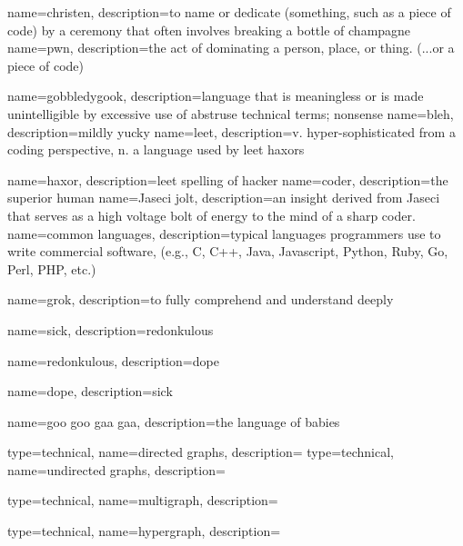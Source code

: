 {
    name=christen,
    description={to name or dedicate (something, such as a piece of code) by a ceremony that often involves breaking a bottle of champagne}
}
{
    name=pwn,
    description={the act of dominating a person, place, or thing. (...or a piece of code)}
}

{
    name=gobbledygook,
    description={language that is meaningless or is made unintelligible by excessive use of abstruse technical terms; nonsense}
}
{
    name=bleh,
    description={mildly yucky}
}
{
    name=leet,
    description={v. hyper-sophisticated from a coding perspective, n. a language used by \gls{leet} \gls{haxor}s}
}

{
    name=haxor,
    description={\gls{leet} spelling of hacker}
}
{
    name=coder,
    description={the superior human}
}
{
    name=Jaseci jolt,
    description={an insight derived from Jaseci that serves as a high voltage bolt of energy to the mind of a sharp coder.}
}
{
    name=common languages,
    description={typical languages programmers use to write commercial software, (e.g., C, C++, Java, Javascript, Python, Ruby, Go, Perl, PHP, etc.)}
}

{
    name=grok,
    description={to fully comprehend and understand deeply }
}

{
    name=sick,
    description={\gls{redonkulous}}
}

{
    name=redonkulous,
    description={\gls{dope}}
}

{
    name=dope,
    description={\gls{sick}}
}

{
    name=goo goo gaa gaa,
    description={the language of babies}
}

{
    type=technical,
    name=directed graphs,
    description={}
}
{
    type=technical,
    name=undirected graphs,
    description={}
}

{
    type=technical,
    name=multigraph,
    description={}
}

{
    type=technical,
    name=hypergraph,
    description={}
}

